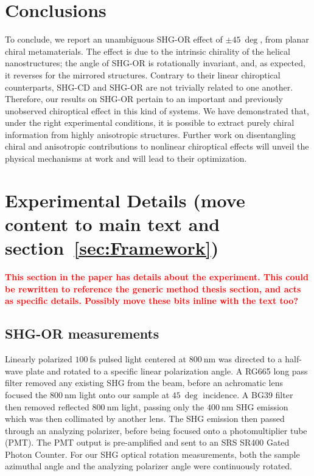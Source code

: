 \section{Conclusions}\label{sec:results:OAinPlanarNanohelices:conclusions}
To conclude, we report an unambiguous SHG-OR effect of $\pm \SI{45}{\deg}$, from planar chiral metamaterials. The effect is due to the intrinsic chirality of the helical nanostructures; the angle of SHG-OR is rotationally invariant, and, as expected, it reverses for the mirrored structures. Contrary to their linear chiroptical counterparts, SHG-CD and SHG-OR are not trivially related to one another. Therefore, our results on SHG-OR pertain to an important and previously unobserved chiroptical effect in this kind of systems. We have demonstrated that, under the right experimental conditions, it is possible to extract purely chiral information from highly anisotropic structures. Further work on disentangling chiral and anisotropic contributions to nonlinear chiroptical effects will unveil the physical mechanisms at work and will lead to their optimization. 

\section{Experimental Details (move content to main text and section~\ref{sec:Framework})}\label{sec:results:OAinPlanarNanohelices:methods}
\textcolor{red}{
\textbf{This section in the paper has details about the experiment. This could be rewritten to reference the generic method thesis section, and acts as specific details. Possibly move these bits inline with the text too?}
}

\subsection{SHG-OR measurements}
Linearly polarized $\SI{100}{\femto\s}$ pulsed light centered at $\SI{800}{\nano\m}$ was directed to a half-wave plate and rotated to a specific linear polarization angle. A RG665 long pass filter removed any existing SHG from the beam, before an achromatic lens focused the $\SI{800}{\nano\m}$ light onto our sample at $\SI{45}{\deg}$ incidence. A BG39 filter then removed reflected $\SI{800}{\nano\m}$ light, passing only the $\SI{400}{\nano\m}$ SHG emission which was then collimated by another lens. The SHG emission then passed through an analyzing polarizer, before being focused onto a photomultiplier tube (PMT). The PMT output is pre-amplified and sent to an SRS SR400 Gated Photon Counter. For our SHG optical rotation measurements, both the sample azimuthal angle and the analyzing polarizer angle were continuously rotated. 

